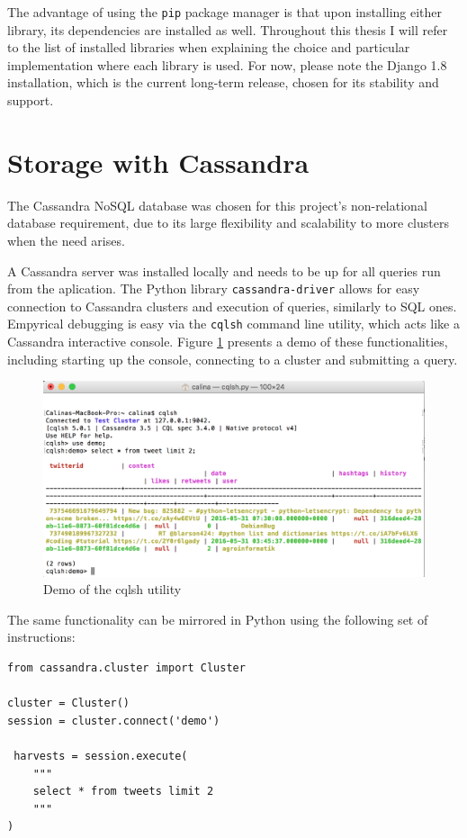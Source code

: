 \documentclass[12pt,a4paper,twoside]{report}
\begin{document}
The advantage of using the \texttt{pip} package manager is that upon installing either library, its dependencies are installed as well. Throughout this thesis I will refer to the list of installed libraries when explaining the choice and particular implementation where each library is used. For now, please note the Django 1.8 installation, which is the current long-term release, chosen for its stability and support.

\section{Storage with Cassandra}
The Cassandra NoSQL database was chosen for this project's non-relational database requirement, due to its large flexibility and scalability to more clusters when the need arises.

A Cassandra server was installed locally and needs to be up for all queries run from the aplication. The Python library \texttt{cassandra-driver} allows for easy connection to Cassandra clusters and execution of queries, similarly to SQL ones. Empyrical debugging is easy via the \texttt{cqlsh} command line utility, which acts like a Cassandra interactive console. Figure \ref{fig:cqlsh} presents a demo of these functionalities, including starting up the console, connecting to a cluster and submitting a query.

\begin{figure}[ht]
    \centering
\includegraphics[width=0.8\columnwidth]{img/cqlsh.png}
    \caption{Demo of the cqlsh utility}
    \label{fig:cqlsh}
\end{figure}

The same functionality can be mirrored in Python using the following set of instructions:

\lstset{basicstyle=\scriptsize}
\begin{lstlisting}
from cassandra.cluster import Cluster

cluster = Cluster()
session = cluster.connect('demo')

 harvests = session.execute(
    """
    select * from tweets limit 2
    """
)
\end{lstlisting}
\end{document}
